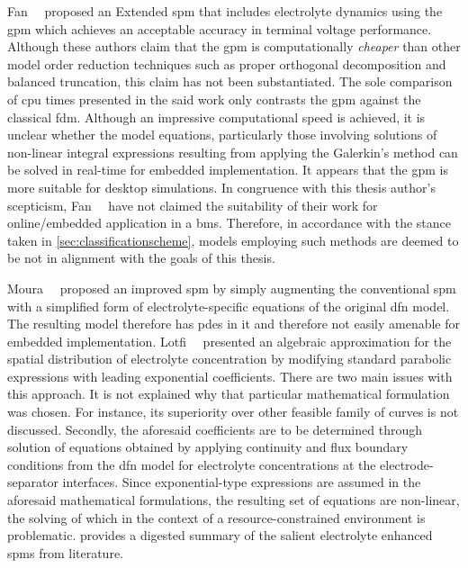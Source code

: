 
Fan~\etal~\cite{Fan2016}   proposed   an   Extended  \gls{spm}   that   includes
electrolyte dynamics using  the \gls{gpm} which achieves  an acceptable accuracy
in terminal voltage performance. Although these authors claim that the \gls{gpm}
is computationally  \emph{cheaper} than  other model order  reduction techniques
such as proper orthogonal decomposition  and balanced truncation, this claim has
not been substantiated. The sole comparison of \gls{cpu} times presented in the
said work  only contrasts  the  \gls{gpm} against  the  classical \gls{fdm}. 
Although an  impressive  computational speed  is  achieved,  it  is unclear 
whether  the model equations,  particularly those involving solutions  of
non-linear integral expressions  resulting from  applying the  Galerkin's 
method can  be solved  in real-time for  embedded implementation.  It appears
that  the \gls{gpm}  is more suitable for desktop simulations. In  congruence
with this thesis author's scepticism, Fan~\etal~\cite{Fan2016} have  not claimed
the suitability of  their work for online/embedded  application  in a 
\gls{bms}.  Therefore,  in accordance with the stance  taken in
\cref{sec:classificationscheme},  models employing such methods are deemed to be
not in alignment with the goals of this thesis.

Moura~\etal~\cite{Moura2017} proposed an improved \gls{spm} by simply augmenting
the  conventional  \gls{spm}  with  a simplified  form  of  electrolyte-specific
equations of  the original  \gls{dfn} model. The  resulting model  therefore has
\glspl{pde} in it and therefore not easily amenable for embedded implementation.
Lotfi~\etal~\cite{Lotfi2017}  presented  an   algebraic  approximation  for  the
spatial  distribution   of  electrolyte  concentration  by   modifying  standard
parabolic expressions with leading exponential  coefficients. There are two main
issues with this approach. It is  not explained why that particular mathematical
formulation was chosen. For instance, its superiority over other feasible family
of  curves is  not discussed.  Secondly, the  aforesaid coefficients  are to  be
determined through  solution of  equations obtained  by applying  continuity and
flux boundary conditions from the \gls{dfn} model for electrolyte concentrations
at  the  electrode-separator   interfaces.  Since  exponential-type  expressions
are  assumed  in the  aforesaid  mathematical  formulations, the  resulting  set
of  equations  are  non-linear,  the  solving  of which  in  the  context  of  a
resource-constrained environment is problematic.
 provides a digested summary of the 
salient electrolyte enhanced \glspl{spm} from literature.

